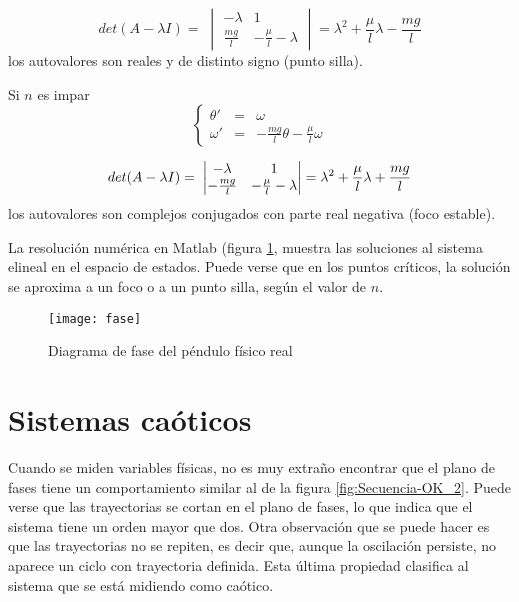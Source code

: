 \begin{equation}
det(A-\lambda I)= \;
\begin{vmatrix}
-\lambda &1 \\
\frac{mg}{l} &-\frac{\mu}{l}-\lambda
\end{vmatrix}
\nonumber
=\lambda^2+\frac{\mu}{l}\lambda-\frac{mg}{l}
\nonumber
\end{equation}
los autovalores son reales y de distinto signo (punto silla).

Si $n$ es impar
\begin{equation}
\left \{
\begin{array}{rcl}
\theta' &=& \omega\\
\omega' &=& -\frac{mg}{l}\theta-\frac{\mu}{l}\omega
\end{array}
\right. \nonumber
\end{equation}

\begin{equation}
det(A-\lambda I)= \;
\begin{vmatrix}
-\lambda &1 \\
-\frac{mg}{l} &-\frac{\mu}{l}-\lambda
\end{vmatrix}
\nonumber
=\lambda^2+\frac{\mu}{l}\lambda+\frac{mg}{l}\\
\nonumber
\end{equation}
los autovalores son complejos conjugados con parte real negativa (foco estable).

La resolución numérica en Matlab (figura \ref{fig:fase}, muestra las soluciones al sistema elineal en el espacio de estados.
Puede verse que en los puntos críticos, la solución se aproxima a un foco o a un punto silla, según el valor de $n$.
%
\begin{figure}
\centering\texttt{[image: fase]}
\caption{Diagrama de fase del péndulo físico real}
\label{fig:fase}
\end{figure}

\section{Sistemas caóticos}

Cuando se miden variables físicas, no es muy extraño encontrar que el plano de fases tiene un comportamiento similar al de la figura \ref{fig:Secuencia-OK_2}.
Puede verse que las trayectorias se cortan en el plano de fases, lo que indica que el sistema tiene un orden mayor que dos.
Otra observación que se puede hacer es que las trayectorias no se repiten, es decir que, aunque la oscilación persiste, no aparece un ciclo con trayectoria definida.
Esta última propiedad clasifica al sistema que se está midiendo como caótico.

